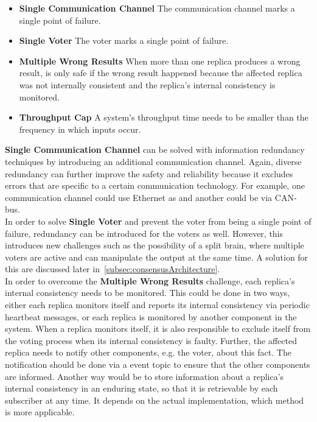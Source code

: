 \newcommand{\ChallengeWR}{\textbf{Multiple Wrong Results}\xspace}
\newcommand{\ChallengeVoter}{\textbf{Single Voter}\xspace}
\newcommand{\ChallengeComm}{\textbf{Single Communication Channel}\xspace}
\newcommand{\ChallengeThrough}{\textbf{Throughput Cap}\xspace}
\begin{itemize}
\item \ChallengeComm The communication channel marks a single point of failure.
\item \ChallengeVoter The voter marks a single point of failure.
\item \ChallengeWR When more than one replica produces a wrong result,  is only safe if the wrong result happened because the affected replica was not internally consistent and the replica's internal consistency is monitored.
\item \ChallengeThrough A system's throughput time needs to be smaller than the frequency in which inputs occur.
\end{itemize}

\ChallengeComm can be solved with information redundancy techniques by introducing an additional communication channel.
Again, diverse redundancy can further improve the safety and reliability because it excludes errors that are specific to a certain communication technology.
For example, one communication channel could use Ethernet as and another could be via CAN-bus.
\\

In order to solve \ChallengeVoter and prevent the voter from being a single point of failure, redundancy can be introduced for the voters as well.
However, this introduces new challenges such as the possibility of a split brain, where multiple voters are active and can manipulate the output at the same time.
A solution for this are discussed later in~\autoref{subsec:consensusArchitecture}.
\\

In order to overcome the \ChallengeWR challenge, each replica's internal consistency needs to be monitored.
This could be done in two ways, either each replica monitors itself and reports its internal consistency via periodic heartbeat messages, or each replica is monitored by another component in the system.
When a replica monitors itself, it is also responsible to exclude itself from the voting process when its internal consistency is faulty.
Further, the affected replica needs to notify other components, e.g. the voter, about this fact.
The notification should be done via a  event topic to ensure that the other components are informed.
Another way would be to store information about a replica's internal consistency in an enduring  state, so that it is retrievable by each subscriber at any time.
It depends on the actual implementation, which method is more applicable.
\\

